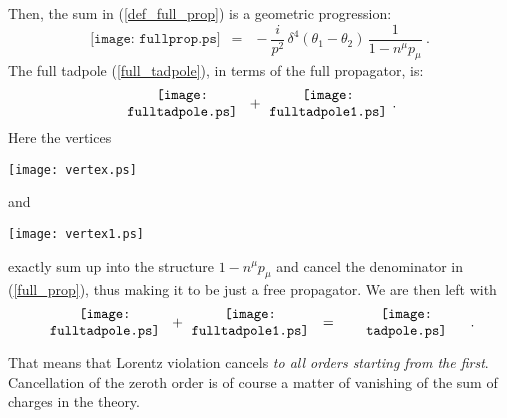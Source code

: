 \documentclass[12pt]{revtex4}
\begin{document}
Then, the sum in (\ref{def_full_prop}) is a 
geometric progression: 
\begin{equation}
\label{full_prop}
\texttt{[image: fullprop.ps]}
 \;~=~\;
- \frac{i}{p^2}\,
\delta^4 (\theta_1 - \theta_2)\,
\frac{1}
           {1 - n^\mu p_\mu}
~.
\end{equation}
The full tadpole (\ref{full_tadpole}), in terms of the 
full propagator, is:
\[
\begin{minipage}[c]{3.0cm}
\centering
\texttt{[image: fulltadpole.ps]} 
\end{minipage}
~+~
\begin{minipage}[c]{3.0cm}
\centering
\texttt{[image: fulltadpole1.ps]} 
\end{minipage}
~.
\]
Here the vertices
\begin{minipage}[b]{1.5cm}
\centering
\texttt{[image: vertex.ps]} 
\vspace{-0.1cm}
\end{minipage}
and
\begin{minipage}[b]{1.5cm}
\centering
\texttt{[image: vertex1.ps]} 
\vspace{-0.1cm}
\end{minipage}
exactly sum up into the structure 
$ 1 - n^\mu p_\mu $
and cancel the denominator in (\ref{full_prop}),
thus making it to be just a free propagator.
We are then left with
\begin{equation}
\label{cancellation}
\begin{minipage}[c]{3.0cm}
\centering
\texttt{[image: fulltadpole.ps]} 
\end{minipage}
~+~
\begin{minipage}[c]{3.0cm}
\centering
\texttt{[image: fulltadpole1.ps]} 
\end{minipage}
~~=~~
\begin{minipage}[c]{3.0cm}
\centering
\texttt{[image: tadpole.ps]} 
\end{minipage}
~.
\end{equation}

That means that Lorentz violation cancels
{\it to all orders starting from the first}.
Cancellation of the zeroth order is of course
a matter of vanishing of the sum of charges 
in the theory.
\end{document}
